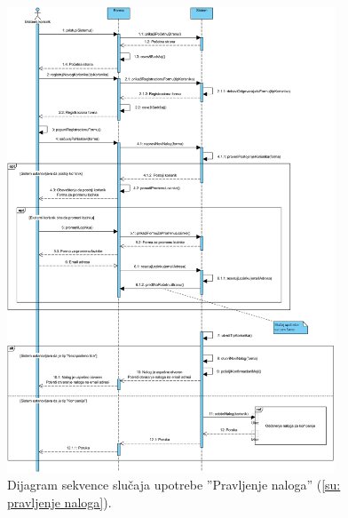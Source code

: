 \begin{figure}[H]
	\centering
	\includegraphics[width=0.87\textwidth]{dijagrami/dijagrami-sekvence/pravljenje-naloga.png}
	\caption{Dijagram sekvence slu\v caja upotrebe ''Pravljenje naloga'' (\ref{su: pravljenje naloga}).}
\end{figure}

